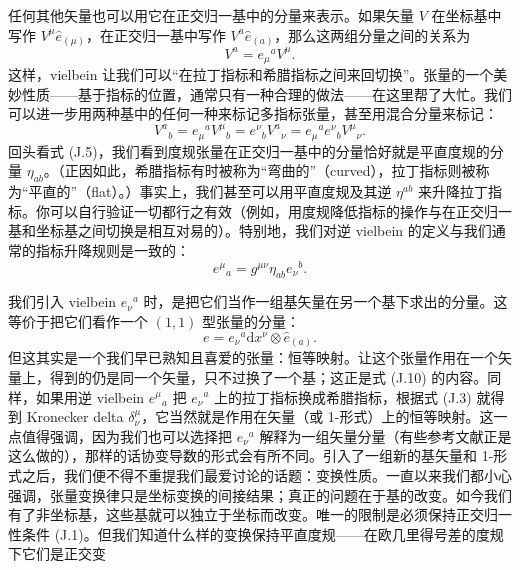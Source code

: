 任何其他矢量也可以用它在正交归一基中的分量来表示。如果矢量 $V$ 在坐标基中写作 $V^{\mu}\hat{e}_{(\mu)}$，在正交归一基中写作 $V^{a}\hat{e}_{(a)}$，那么这两组分量之间的关系为
\begin{equation*}
V^{a} = e_{\mu}{}^{a}V^{\mu}.
\tag{J.10}
\end{equation*}
这样，vielbein 让我们可以“在拉丁指标和希腊指标之间来回切换”。张量的一个美妙性质——基于指标的位置，通常只有一种合理的做法——在这里帮了大忙。我们可以进一步用两种基中的任何一种来标记多指标张量，甚至用混合分量来标记：
\begin{equation*}
V^{a}{}_{b} = e_{\mu}{}^{a}V^{\mu}{}_{b} = e^{\nu}{}_{b}V^{a}{}_{\nu} = e_{\mu}{}^{a}e^{\nu}{}_{b}V^{\mu}{}_{\nu}.
\tag{J.11}
\end{equation*}
回头看式 (J.5)，我们看到度规张量在正交归一基中的分量恰好就是平直度规的分量 $\eta_{ab}$。（正因如此，希腊指标有时被称为“弯曲的”（curved），拉丁指标则被称为“平直的”（flat）。）事实上，我们甚至可以用平直度规及其逆 $\eta^{ab}$ 来升降拉丁指标。你可以自行验证一切都行之有效（例如，用度规降低指标的操作与在正交归一基和坐标基之间切换是相互对易的）。特别地，我们对逆 vielbein 的定义与我们通常的指标升降规则是一致的：
\begin{equation*}
e^{\mu}{}_{a} = g^{\mu\nu}\eta_{ab}e_{\nu}{}^{b}.
\tag{J.12}
\end{equation*}

我们引入 vielbein $e_{\nu}{}^{a}$ 时，是把它们当作一组基矢量在另一个基下求出的分量。这等价于把它们看作一个 $(1,1)$ 型张量的分量：
\begin{equation*}
e = e_{\nu}{}^{a}\mathrm{d}x^{\nu}\otimes\hat{e}_{(a)}.
\tag{J.13}
\end{equation*}
但这其实是一个我们早已熟知且喜爱的张量：恒等映射。让这个张量作用在一个矢量上，得到的仍是同一个矢量，只不过换了一个基；这正是式 (J.10) 的内容。同样，如果用逆 vielbein $e^{\mu}{}_{a}$ 把 $e_{\nu}{}^{a}$ 上的拉丁指标换成希腊指标，根据式 (J.3) 就得到 Kronecker delta $\delta^{\mu}_{\nu}$，它当然就是作用在矢量（或 1-形式）上的恒等映射。这一点值得强调，因为我们也可以选择把 $e_{\nu}{}^{a}$ 解释为一组矢量分量（有些参考文献正是这么做的），那样的话协变导数的形式会有所不同。引入了一组新的基矢量和 1-形式之后，我们便不得不重提我们最爱讨论的话题：变换性质。一直以来我们都小心强调，张量变换律只是坐标变换的间接结果；真正的问题在于基的改变。如今我们有了非坐标基，这些基就可以独立于坐标而改变。唯一的限制是必须保持正交归一性条件 (J.1)。但我们知道什么样的变换保持平直度规——在欧几里得号差的度规下它们是正交变

